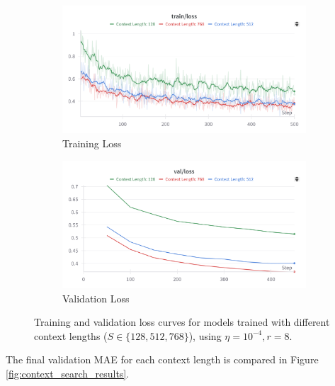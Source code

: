 \documentclass{article}
\begin{document}
\begin{figure}[!htbp] 
    \centering 
    \begin{subfigure}[b]{0.48\linewidth} 
        \centering
        \includegraphics[width=\linewidth]{M2 Course Work/Images/sweep_context_length_training.png}
        \caption{Training Loss} %
        \label{fig:context_search_train_loss} %
    \end{subfigure}
    \hfill 
    \begin{subfigure}[b]{0.48\linewidth}
        \centering
        \includegraphics[width=\linewidth]{M2 Course Work/Images/sweep_context_length_validation.png}
        \caption{Validation Loss} %
        \label{fig:context_search_valid_loss} %
    \end{subfigure}
    \caption{Training and validation loss curves for models trained with different context lengths ($S \in \{128, 512, 768\}$), using $\eta=10^{-4}, r=8$.}
    \label{fig:context_search_loss_curves} %
\end{figure}

The final validation MAE for each context length is compared in Figure \ref{fig:context_search_results}.
\end{document}
